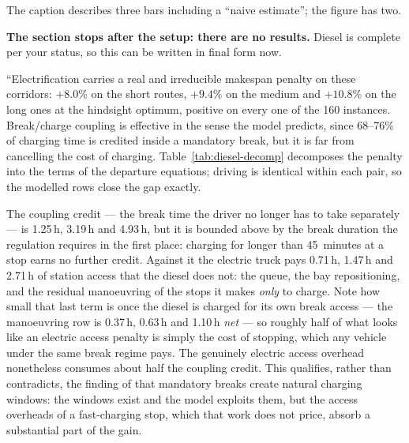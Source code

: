 \begin{afix}
The caption describes three bars including a ``naive estimate''; the figure has
two. 
\end{afix}

\begin{anew}
\textbf{The section stops after the setup: there are no results.} Diesel is
complete per your status, so this can be written in final form now.

\medskip
``Electrification carries a real and irreducible makespan penalty on these
corridors: $+8.0\%$ on the short routes, $+9.4\%$ on the medium and $+10.8\%$ on
the long ones at the hindsight optimum, positive on every one of the 160
instances. Break/charge coupling is effective in the sense the model predicts,
since 68--76\% of charging time is credited inside a mandatory break, but it is
far from cancelling the cost of charging. Table~\ref{tab:diesel-decomp}
decomposes the penalty into the terms of the departure equations; driving is
identical within each pair, so the modelled rows close the gap exactly.

\medskip
The coupling credit --- the break time the driver no longer has to take
separately --- is 1.25\,h, 3.19\,h and 4.93\,h, but it is bounded above by the
break duration the regulation requires in the first place: charging for longer
than 45~minutes at a stop earns no further credit. Against it the electric truck
pays 0.71\,h, 1.47\,h and 2.71\,h of station access that the diesel does not: the
queue, the bay repositioning, and the residual manoeuvring of the stops it makes
\emph{only} to charge. Note how small that last term is once the diesel is
charged for its own break access --- the manoeuvring row is 0.37\,h, 0.63\,h and
1.10\,h \emph{net} --- so roughly half of what looks like an electric access
penalty is simply the cost of stopping, which any vehicle under the same break
regime pays. The genuinely electric access overhead nonetheless consumes about
half the coupling credit. This qualifies, rather than contradicts, the finding of
\citet{brockmann_break-and-charge_2025} that mandatory breaks create natural
charging windows: the windows exist and the model exploits them, but the access
overheads of a fast-charging stop, which that work does not price, absorb a
substantial part of the gain.


\end{anew}
